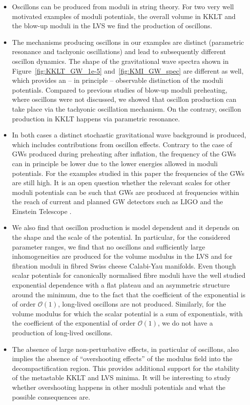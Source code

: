\documentclass[12pt]{article}
\begin{document}
\begin{itemize}
\item{}
Oscillons can be produced from moduli in string theory. For two very well motivated examples of moduli potentials, the overall volume in KKLT and the blow-up moduli in the LVS we find the production of oscillons. 

\item{} The mechanisms producing oscillons in our examples are distinct (parametric resonance and tachyonic oscillations) and lead to subsequently different oscillon dynamics. The shape of the gravitational wave spectra shown in Figure~\ref{fig:KKLT_GW_1e-5} and~\ref{fig:KMI_GW_spec} are different as well, which provides an -- in principle -- observable distinction of the moduli potentials. Compared to previous studies of blow-up moduli preheating, where oscillons were not discussed, we showed that oscillon production can take place via the tachyonic oscillation mechanism. On the contrary, oscillon production in KKLT happens via parametric resonance.  

\item{}
In both cases a distinct stochastic gravitational wave background is produced, which includes contributions from oscillon effects. Contrary to the case of GWs produced during preheating after inflation, the frequency of the GWs can in principle be lower due to the lower energies allowed in moduli potentials. For the examples studied in this paper the frequencies of the GWs are still high. It is an open question whether the relevant scales for other moduli potentials can be such that GWs are produced at frequencies within the reach of current and planned GW detectors such as LIGO \cite{TheLIGOScientific:2014jea} and the Einstein Telescope \cite{ET}. 


\item{}
We also find that oscillon production is model dependent and it depends on the shape and the scale of the potential. In particular, for the considered parameter ranges, we find that no oscillons and sufficiently large inhomogeneities are produced for the volume modulus in the LVS and for fibration moduli in fibred Swiss cheese Calabi-Yau manifolds. Even though scalar  potentials for canonically normalised fibre moduli have the well studied exponential dependence with a flat plateau and an asymmetric structure around the minimum, due to the fact that the coefficient of the exponential is of order $\mathcal{O}(1)$, long-lived oscillons are not produced. Similarly, for the volume modulus for which the scalar potential is a sum of exponentials, with the coefficient of the exponential of order $\mathcal{O}(1)$, we do not have a production of long-lived oscillons. 

\item{}
The absence of large non-perturbative effects, in particular of oscillons, also implies the absence of ``overshooting effects'' of the modulus field into the decompactification region. This provides additional support for the stability of the metastable KKLT and LVS minima. It will be interesting to study whether overshooting happens in other moduli potentials and what the possible consequences are. 

\end{itemize}
\end{document}
